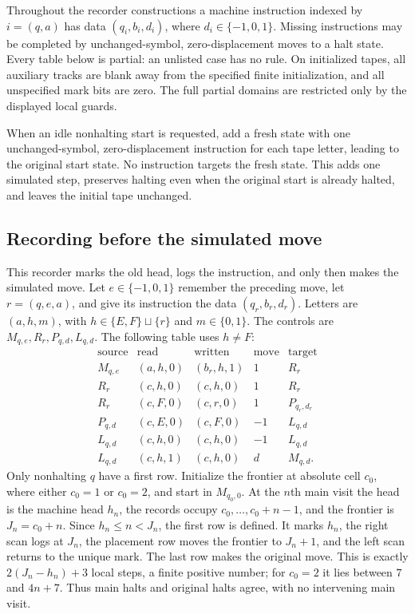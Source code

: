 Throughout the recorder constructions a machine instruction indexed by $i=(q,a)$ has
data $(q_i,b_i,d_i)$, where $d_i\in\{-1,0,1\}$.  Missing instructions
may be completed by unchanged-symbol, zero-displacement moves to a halt
state.  Every table below is partial: an unlisted case
has no rule. On initialized tapes, all auxiliary tracks are blank away
from the specified finite initialization, and all unspecified mark bits
are zero. The full partial domains are restricted only by the displayed
local guards.

When an idle nonhalting start is requested, add a fresh state with one
unchanged-symbol, zero-displacement instruction for each tape letter,
leading to the original start state. No instruction targets the fresh
state. This adds one simulated step, preserves halting even when the
original start is already halted, and leaves the initial tape unchanged.

\subsection{Recording before the simulated move}
\label{sv:old-head}\label{sv:periodic-options}
This recorder marks the old head, logs the instruction, and only
then makes the simulated move.  Let $e\in\{-1,0,1\}$ remember the
preceding move, let $r=(q,e,a)$, and give its instruction the data
$(q_r,b_r,d_r)$.  Letters are $(a,h,m)$, with
$h\in\{E,F\}\sqcup\{r\}$ and $m\in\{0,1\}$.  The controls are
$M_{q,e},R_r,P_{q,d},L_{q,d}$.  The following table uses $h\ne F$:
\begin{equation}\label{sv:old-head-table}
\begin{array}{c|c|c|c|c}
\text{source}&\text{read}&\text{written}&\text{move}&\text{target}\\\hline
M_{q,e}&(a,h,0)&(b_r,h,1)&1&R_r\\
R_r&(c,h,0)&(c,h,0)&1&R_r\\
R_r&(c,F,0)&(c,r,0)&1&P_{q_r,d_r}\\
P_{q,d}&(c,E,0)&(c,F,0)&-1&L_{q,d}\\
L_{q,d}&(c,h,0)&(c,h,0)&-1&L_{q,d}\\
L_{q,d}&(c,h,1)&(c,h,0)&d&M_{q,d}.
\end{array}
\end{equation}
Only nonhalting $q$ have a first row.  Initialize the frontier at
absolute cell $c_0$, where either $c_0=1$ or $c_0=2$, and start in
$M_{q_0,0}$.  At the $n$th main visit the head is the machine head
$h_n$, the records occupy $c_0,\ldots,c_0+n-1$, and the frontier is
$J_n=c_0+n$.  Since $h_n\le n<J_n$, the first row is defined.
It marks $h_n$, the right scan logs at $J_n$, the placement row moves
the frontier to $J_n+1$, and the left scan returns to the unique mark.
The last row makes the original move.  This is exactly
$2(J_n-h_n)+3$ local steps, a finite positive number; for $c_0=2$
it lies between $7$ and $4n+7$.  Thus main halts and original halts
agree, with no intervening main visit.

